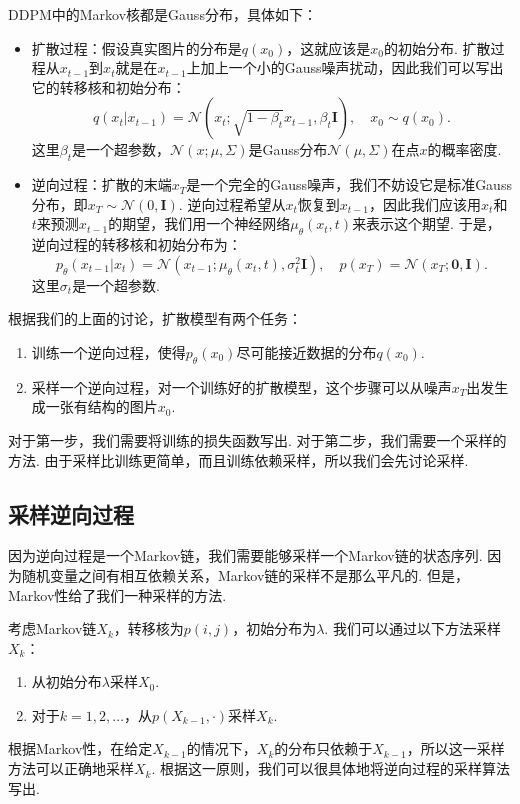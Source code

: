 DDPM中的Markov核都是Gauss分布，具体如下：
\begin{itemize}
    \item 扩散过程：假设真实图片的分布是$q(x_0)$，这就应该是$x_0$的初始分布. 扩散过程从$x_{t-1}$到$x_t$就是在$x_{t-1}$上加上一个小的Gauss噪声扰动，因此我们可以写出它的转移核和初始分布：
    \[q(x_t|x_{t-1}) = \mathcal{N}(x_t; \sqrt{1 - \beta_t} x_{t-1}, \beta_t \mathbf{I}),\quad x_0\sim q(x_0).\]
    这里$\beta_t$是一个超参数，$\mathcal{N}(x;\mu,\Sigma)$是Gauss分布$\mathcal{N}(\mu,\Sigma)$在点$x$的概率密度. 
    \item 逆向过程：扩散的末端$x_T$是一个完全的Gauss噪声，我们不妨设它是标准Gauss分布，即$x_T\sim\mathcal{N}(0,\mathbf{I})$. 逆向过程希望从$x_t$恢复到$x_{t-1}$，因此我们应该用$x_t$和$t$来预测$x_{t-1}$的期望，我们用一个神经网络$\mu_\theta(x_t,t)$来表示这个期望. 于是，逆向过程的转移核和初始分布为：
    \[
    p_{\theta}(x_{t-1}|x_t) = \mathcal{N}(x_{t-1}; \mu_{\theta}(x_t, t), \sigma_t^2\mathbf{I}),\quad p(x_T)=\mathcal{N}(x_T;\mathbf{0},\mathbf{I}).
    \]  
    这里$\sigma_t$是一个超参数. 
\end{itemize}

根据我们的上面的讨论，扩散模型有两个任务：

\begin{enumerate}
    \item 训练一个逆向过程，使得$p_\theta(x_0)$尽可能接近数据的分布$q(x_0)$. 
    \item 采样一个逆向过程，对一个训练好的扩散模型，这个步骤可以从噪声$x_T$出发生成一张有结构的图片$x_0$. 
\end{enumerate}

对于第一步，我们需要将训练的损失函数写出. 对于第二步，我们需要一个采样的方法. 由于采样比训练更简单，而且训练依赖采样，所以我们会先讨论采样. 

\subsection{采样逆向过程}

因为逆向过程是一个Markov链，我们需要能够采样一个Markov链的状态序列. 因为随机变量之间有相互依赖关系，Markov链的采样不是那么平凡的. 但是，Markov性给了我们一种采样的方法. 

考虑Markov链$X_k$，转移核为$p(i,j)$，初始分布为$\lambda$. 我们可以通过以下方法采样$X_k$：
\begin{enumerate}
    \item 从初始分布$\lambda$采样$X_0$.
    \item 对于$k=1,2,\dots$，从$p(X_{k-1},\cdot)$采样$X_k$.
\end{enumerate}
根据Markov性，在给定$X_{k-1}$的情况下，$X_k$的分布只依赖于$X_{k-1}$，所以这一采样方法可以正确地采样$X_k$. 根据这一原则，我们可以很具体地将逆向过程的采样算法写出. 

